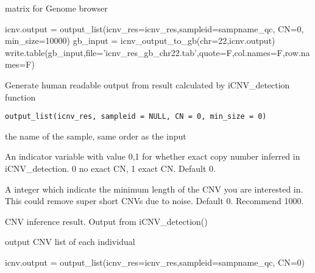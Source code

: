 \documentclass[a4paper]{book}
\begin{document}
%
\begin{Value}
matrix for Genome browser
\end{Value}
%
\begin{Examples}
\begin{ExampleCode}
icnv.output = output_list(icnv_res=icnv_res,sampleid=sampname_qc, CN=0, min_size=10000)
gb_input = icnv_output_to_gb(chr=22,icnv.output)
write.table(gb_input,file='icnv_res_gb_chr22.tab',quote=F,col.names=F,row.names=F)
\end{ExampleCode}
\end{Examples}
%
\begin{Description}\relax
Generate human readable output from result calculated by iCNV\_detection function
\end{Description}
%
\begin{Usage}
\begin{verbatim}
output_list(icnv_res, sampleid = NULL, CN = 0, min_size = 0)
\end{verbatim}
\end{Usage}
%
\begin{Arguments}
\begin{ldescription}
\item[\code{sampleid}] the name of the sample, same order as the input

\item[\code{CN}] An indicator variable with value 0,1 for whether exact copy number inferred in iCNV\_detection. 0 no exact CN, 1 exact CN. Default 0.

\item[\code{min\_size}] A integer which indicate the minimum length of the CNV you are interested in. This could remove super short CNVs due to noise. Default 0. Recommend 1000.

\item[\code{testres}] CNV inference result. Output from iCNV\_detection()
\end{ldescription}
\end{Arguments}
%
\begin{Value}
output CNV list of each individual
\end{Value}
%
\begin{Examples}
\begin{ExampleCode}
icnv.output = output_list(icnv_res=icnv_res,sampleid=sampname_qc, CN=0)
\end{ExampleCode}
\end{Examples}
\end{document}
